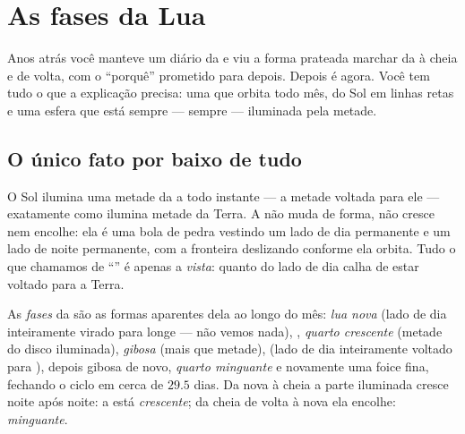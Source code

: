 \chapter{As fases da Lua}\label{ch:g7:moon-phases}

Anos atrás você manteve um diário da  e viu a forma prateada
marchar da  à cheia e de volta, com o ``porquê''
prometido para depois. Depois é agora. Você tem tudo o que a
explicação precisa: uma  que orbita todo mês,  do Sol em linhas
retas e uma esfera que está sempre --- sempre --- iluminada pela
metade.

\section{O único fato por baixo de tudo}

\begin{proposition}\label{prop:g7:moon-phases:halflit}
O Sol ilumina uma metade da  a todo instante --- a metade voltada
para ele --- exatamente como ilumina metade da Terra. A  não muda
de forma, não cresce nem encolhe: ela é uma bola de pedra vestindo um
lado de dia permanente e um lado de noite permanente, com a fronteira
deslizando conforme ela orbita. Tudo o que chamamos de ``'' é
apenas a \emph{vista}: quanto do lado de dia calha de estar voltado
para a Terra.
\end{proposition}

\begin{definition}[Fases]\label{def:g7:moon-phases:phases}
As \emph{fases} da  são as formas aparentes dela ao
longo do mês: \emph{lua nova} (lado de dia inteiramente virado para
longe --- não vemos nada), \emph{}, \emph{quarto
crescente} (metade do disco iluminada), \emph{gibosa} (mais que
metade), \emph{} (lado de dia inteiramente voltado para
), depois gibosa de novo, \emph{quarto minguante} e novamente uma
foice fina, fechando o ciclo em cerca de $29.5$ dias. Da nova à cheia
a parte iluminada cresce noite após noite: a  está
\emph{crescente}; da cheia de volta à nova ela
encolhe: \emph{minguante}.
\end{definition}

